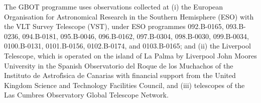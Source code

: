 \documentclass[longauth]{aa}
\begin{document}
\begin{appendix}
The GBOT programme  uses observations collected at (i) the European Organisation for Astronomical Research in the Southern Hemisphere (ESO) with the VLT Survey Telescope (VST), under ESO programmes
092.B-0165,
093.B-0236,
094.B-0181,
095.B-0046,
096.B-0162,
097.B-0304,
098.B-0030,
099.B-0034,
0100.B-0131,
0101.B-0156,
0102.B-0174, and
0103.B-0165;
%
%
and (ii) the Liverpool Telescope, which is operated on the island of La Palma by Liverpool John Moores University in the Spanish Observatorio del Roque de los Muchachos of the Instituto de Astrof\'{\i}sica de Canarias with financial support from the United Kingdom Science and Technology Facilities Council, and (iii) telescopes of the Las Cumbres Observatory Global Telescope Network.
\end{appendix}
\end{document}
